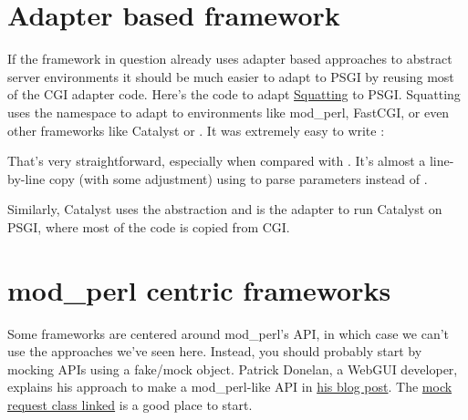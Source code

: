 \section{Adapter based framework}\label{adapter-based-framework}

If the framework in question already uses adapter based approaches to
abstract server environments it should be much easier to adapt to PSGI
by reusing most of the CGI adapter code. Here's the code to adapt
\href{http://search.cpan.org/perldoc?Squatting}{Squatting} to PSGI.
Squatting uses the  namespace to adapt to environments
like mod\_perl, FastCGI, or even other frameworks like Catalyst or
. It was extremely easy to write
\href{http://search.cpan.org/perldoc?Squatting::On::PSGI}{}:


That's very straightforward, especially when compared with
\href{http://cpansearch.perl.org/src/BEPPU/Squatting-0.70/lib/Squatting/On/CGI.pm}{}.
It's almost a line-by-line copy (with some adjustment) using
 to parse parameters instead of .

Similarly, Catalyst uses the  abstraction and
\href{http://search.cpan.org/perldoc?Catalyst::Engine::PSGI}{}
is the adapter to run Catalyst on PSGI, where most of the code is copied
from CGI.

\section{mod\_perl centric
frameworks}\label{modux5fperl-centric-frameworks}

Some frameworks are centered around mod\_perl's API, in which case we
can't use the approaches we've seen here. Instead, you should probably
start by mocking  APIs using a fake/mock object. Patrick
Donelan, a WebGUI developer, explains his approach to make a
mod\_perl-like API in
\href{http://blog.patspam.com/2009/plack-roundup-at-sf-pm}{his blog
post}. The
\href{http://github.com/pdonelan/webgui/blob/plebgui/lib/WebGUI/Session/Plack.pm}{mock
request class linked} is a good place to start.

